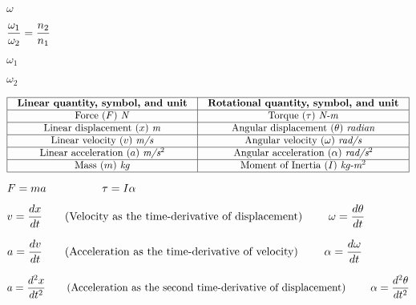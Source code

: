 \documentclass[12pt,a4paper,margin=2cm]{book}
\def\lthtmlcheckvsize{\ifdim\ht\sizebox<\vsize 
  \ifdim\wd\sizebox<\hsize\expandafter\hfill\fi \expandafter\vfill
  \else\expandafter\vss\fi}%
\begin{document}
{\newpage\clearpage
{}%
$ \omega$%
\lthtmlindisplaymathZ
\lthtmlcheckvsize\clearpage}

{\newpage\clearpage
{}%
$\displaystyle {\omega_1 \over \omega_2} = {n_2 \over n_1}$%
\lthtmlindisplaymathZ
\lthtmlcheckvsize\clearpage}

{\newpage\clearpage
{}%
$ \omega_1$%
\lthtmlindisplaymathZ
\lthtmlcheckvsize\clearpage}

{\newpage\clearpage
{}%
$ \omega_2$%
\lthtmlindisplaymathZ
\lthtmlcheckvsize\clearpage}

{\newpage\clearpage
{}%
$\displaystyle \vbox{\offinterlineskip
\halign{\strut
\vrule \quad\hfil # \  \hfil & 
\vrule \quad\hfil # \  \hfil \vrule \cr
\noalign{\hrule }
\textbf{Linear quantity, symbol, and unit} & \textbf{Rotational quantity, symbol, and unit} \cr
\noalign{\hrule }
Force ($F$) \textit{N} & Torque ($\tau$) \textit{N-m} \cr
\noalign{\hrule }
Linear displacement ($x$) \textit{m} & Angular displacement ($\theta$) \textit{radian} \cr
\noalign{\hrule }
Linear velocity ($v$) \textit{m/s} & Angular velocity ($\omega$) \textit{rad/s} \cr
\noalign{\hrule }
Linear acceleration ($a$) \textit{m/s$^{2}$} & Angular acceleration ($\alpha$) \textit{rad/s$^{2}$} \cr
\noalign{\hrule }
Mass ($m$) \textit{kg} & Moment of Inertia ($I$) \textit{kg-m$^{2}$} \cr
\noalign{\hrule }
} %
}$%
\lthtmlindisplaymathZ
\lthtmlcheckvsize\clearpage}

{\newpage\clearpage
{}%
$\displaystyle F = ma \hskip 50pt \tau = I \alpha$%
\lthtmlindisplaymathZ
\lthtmlcheckvsize\clearpage}

{\newpage\clearpage
{}%
$\displaystyle v = {dx \over dt} \hbox{\hskip 20pt (Velocity as the time-derivative of displacement) \hskip 20pt} \omega = {d \theta \over dt}$%
\lthtmlindisplaymathZ
\lthtmlcheckvsize\clearpage}

{\newpage\clearpage
{}%
$\displaystyle a = {dv \over dt} \hbox{\hskip 20pt (Acceleration as the time-derivative of velocity) \hskip 20pt} \alpha = {d \omega \over dt}$%
\lthtmlindisplaymathZ
\lthtmlcheckvsize\clearpage}

{\newpage\clearpage
{}%
$\displaystyle a = {d^2x \over dt^2} \hbox{\hskip 20pt (Acceleration as the second time-derivative of displacement) \hskip 20pt} \alpha = {d^2 \theta \over dt^2}$%
\lthtmlindisplaymathZ
\lthtmlcheckvsize\clearpage}
\end{document}
